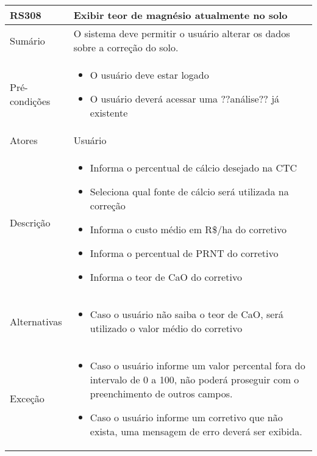 \begin{quadro}[H]
    \begin{tabular}{|p{3cm}|p{11cm}|}
        \hline
        \textbf{RS308} & \textbf{Exibir teor de magnésio atualmente no solo}                          \\
        \hline
        Sumário        & O sistema deve permitir o usuário alterar os dados sobre a correção do solo. \\
        \hline
        Pré-condições  & \begin{itemize}
            \item O usuário deve estar logado
            \item O usuário deverá acessar uma ??análise?? já existente
        \end{itemize}                                                   \\
        \hline
        Atores         & Usuário                                                                      \\
        \hline
        Descrição      &
        \begin{itemize}
            \item Informa o percentual de cálcio desejado na CTC
            \item Seleciona qual fonte de cálcio será utilizada na correção
            \item Informa o custo médio em R\$/ha do corretivo
            \item Informa o percentual de PRNT do corretivo
            \item Informa o teor de CaO do corretivo
        \end{itemize}                                                                    \\
        \hline
        Alternativas   &
        \begin{itemize}
            \item Caso o usuário não saiba o teor de CaO, será utilizado o valor médio do corretivo
        \end{itemize}                                                                    \\
        \hline
        Exceção        &
        \begin{itemize}
            \item Caso o usuário informe um valor percental fora do intervalo de 0 a 100, não poderá proseguir com o preenchimento de outros campos.
            \item Caso o usuário informe um corretivo que não exista, uma mensagem de erro deverá ser exibida.
        \end{itemize}                                                                    \\
        \hline
    \end{tabular}
\end{quadro}

